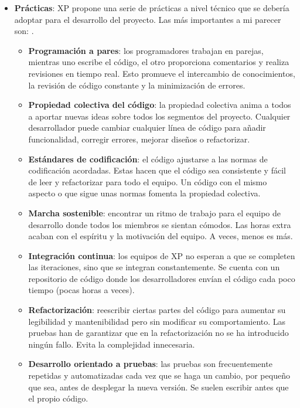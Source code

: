 \begin{itemize}
    \item \textbf{Prácticas}: XP propone una serie de prácticas a nivel técnico que se debería adoptar para el desarrollo del proyecto. Las más importantes a mi parecer son: \cite{extremeXP_Page}.
    \begin{itemize}
        \item \textbf{Programación a pares}: los programadores trabajan en parejas, mientras uno escribe el código, el otro proporciona comentarios y realiza revisiones en tiempo real. Esto promueve el intercambio de conocimientos, la revisión de código constante y la minimización de errores.
        \item \textbf{Propiedad colectiva del código}: la propiedad colectiva anima a todos a aportar nuevas ideas sobre todos los segmentos del proyecto. Cualquier desarrollador puede cambiar cualquier línea de código para añadir funcionalidad, corregir errores, mejorar diseños o refactorizar.
        \item \textbf{Estándares de codificación}: el código ajustarse a las normas de codificación acordadas. Estas hacen que el código sea consistente y fácil de leer y refactorizar para todo el equipo. Un código con el mismo aspecto o que sigue unas normas fomenta la propiedad colectiva.
        \item \textbf{Marcha sostenible}: encontrar un ritmo de trabajo para el equipo de desarrollo donde todos los miembros se sientan cómodos. Las horas extra acaban con el espíritu y la motivación del equipo. A veces, menos es más.
        \item \textbf{Integración continua}: los equipos de XP no esperan a que se completen las iteraciones, sino que se integran constantemente. Se cuenta con un repositorio de código donde los desarrolladores envían el código cada poco tiempo (pocas horas a veces).
        \item \textbf{Refactorización}: reescribir ciertas partes del código para aumentar su legibilidad y mantenibilidad pero sin modificar su comportamiento. Las pruebas han de garantizar que en la refactorización no se ha introducido ningún fallo. Evita la complejidad innecesaria.
        \item \textbf{Desarrollo orientado a pruebas}: las pruebas son frecuentemente repetidas y automatizadas cada vez que se haga un cambio, por pequeño que sea, antes de desplegar la nueva versión. Se suelen escribir antes que el propio código.
    \end{itemize}
    

\end{itemize}
